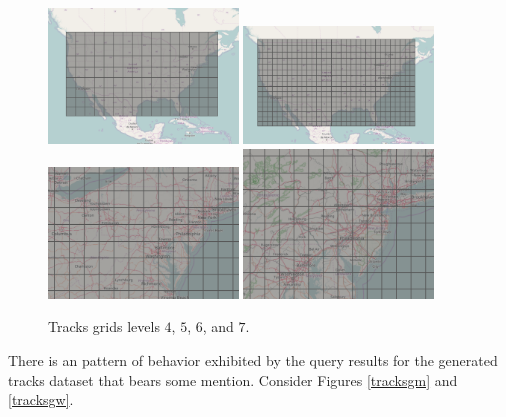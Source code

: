 \begin{figure}[h!tb]
  \centering
  \includegraphics[width=0.45\textwidth]{../docs/img/tracks-usa-grid-4.png}
  \includegraphics[width=0.45\textwidth]{../docs/img/tracks-usa-grid-5.png}
  \newline
  \includegraphics[width=0.45\textwidth]{../docs/img/tracks-usa-grid-6.png}
  \includegraphics[width=0.45\textwidth]{../docs/img/tracks-usa-grid-7.png}
  \caption{Tracks grids levels $4$, $5$, $6$, and $7$.}
  \label{tracks}
\end{figure}

There is an pattern of behavior exhibited by the query results for the generated tracks dataset that bears some mention.
Consider Figures \ref{tracksgm} and \ref{tracksgw}.

